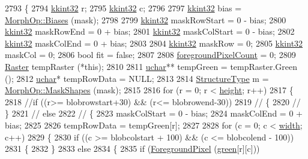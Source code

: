 \begin{DoxyCode}
2793 \{
2794   \hyperlink{namespace_k_k_b_a8fa4952cc84fda1de4bec1fbdd8d5b1b}{kkint32}  r;
2795   \hyperlink{namespace_k_k_b_a8fa4952cc84fda1de4bec1fbdd8d5b1b}{kkint32}  c;
2796 
2797   \hyperlink{namespace_k_k_b_a8fa4952cc84fda1de4bec1fbdd8d5b1b}{kkint32}  bias = \hyperlink{class_k_k_b_1_1_morph_op_affa9101a819e7103df69c8851cd7e920}{MorphOp::Biases} (mask);
2798 
2799   \hyperlink{namespace_k_k_b_a8fa4952cc84fda1de4bec1fbdd8d5b1b}{kkint32}  maskRowStart = 0 - bias;
2800   \hyperlink{namespace_k_k_b_a8fa4952cc84fda1de4bec1fbdd8d5b1b}{kkint32}  maskRowEnd   = 0 + bias;
2801   \hyperlink{namespace_k_k_b_a8fa4952cc84fda1de4bec1fbdd8d5b1b}{kkint32}  maskColStart = 0 - bias;
2802   \hyperlink{namespace_k_k_b_a8fa4952cc84fda1de4bec1fbdd8d5b1b}{kkint32}  maskColEnd   = 0 + bias;
2803 
2804   \hyperlink{namespace_k_k_b_a8fa4952cc84fda1de4bec1fbdd8d5b1b}{kkint32}  maskRow = 0;
2805   \hyperlink{namespace_k_k_b_a8fa4952cc84fda1de4bec1fbdd8d5b1b}{kkint32}  maskCol = 0;
2806   \textcolor{keywordtype}{bool}  fit    = \textcolor{keyword}{false};
2807 
2808   \hyperlink{class_k_k_b_1_1_raster_aa7e86253f4b9c347da718732e44b60e8}{foregroundPixelCount} = 0;
2809   \hyperlink{class_k_k_b_1_1_raster}{Raster}  tempRaster (*\textcolor{keyword}{this});
2810 
2811   \hyperlink{namespace_k_k_b_ace9969169bf514f9ee6185186949cdf7}{uchar}**     tempGreen   = tempRaster.Green ();
2812   \hyperlink{namespace_k_k_b_ace9969169bf514f9ee6185186949cdf7}{uchar}*      tempRowData = NULL;
2813 
2814   \hyperlink{class_k_k_b_1_1_morph_op_a09e4aff7e81327849855ff72082d85b3}{StructureType}  m = \hyperlink{class_k_k_b_1_1_morph_op_a7e477ebbb2c0cdd67388cb841685c02b}{MorphOp::MaskShapes} (mask);
2815 
2816   \textcolor{keywordflow}{for}  (r = 0;  r < \hyperlink{class_k_k_b_1_1_raster_af39ff189de4fbb6de98392e187efafb7}{height};  r++)
2817   \{
2818     \textcolor{comment}{//if ((r>= blobrowstart+30) && (r<= blobrowend-30))}
2819     \textcolor{comment}{// \{}
2820     \textcolor{comment}{// \}}
2821   \textcolor{comment}{// else}
2822   \textcolor{comment}{// \{}
2823     maskColStart = 0 - bias;
2824     maskColEnd   = 0 + bias;
2825 
2826     tempRowData = tempGreen[r];
2827 
2828     \textcolor{keywordflow}{for}  (c = 0; c < \hyperlink{class_k_k_b_1_1_raster_ae0bcc103e191c3421d7692dc69ceb554}{width}; c++)
2829     \{
2830       \textcolor{keywordflow}{if}  ((c >= blobcolstart + 100)  &&  (c <= blobcolend - 100))
2831       \{
2832       \}
2833       \textcolor{keywordflow}{else}
2834       \{
2835         \textcolor{keywordflow}{if}  (\hyperlink{class_k_k_b_1_1_raster_aa1e1363589e719eb64f0957281b84b6a}{ForegroundPixel} (\hyperlink{class_k_k_b_1_1_raster_a2d2238911145488e226cd2e34fc8448c}{green}[r][c]))

\end{DoxyCode}

